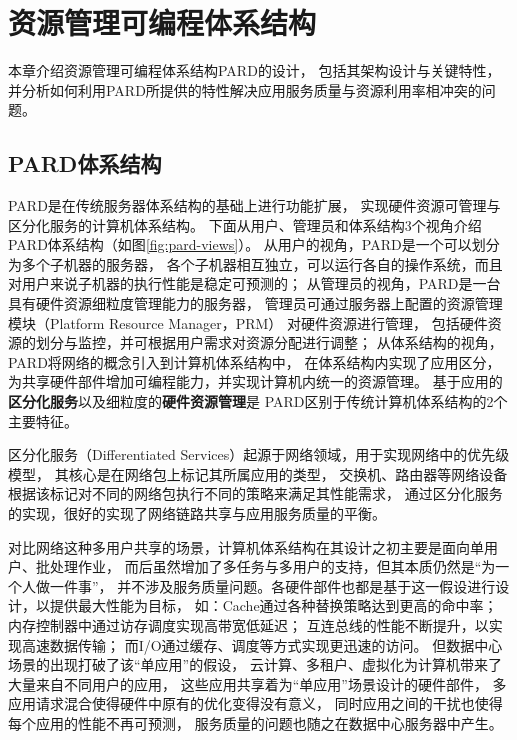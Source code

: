 

\chapter{资源管理可编程体系结构}
\label{chap:pardarch}

本章介绍资源管理可编程体系结构PARD\cite{pard:2015}的设计，
包括其架构设计与关键特性，
并分析如何利用PARD所提供的特性解决应用服务质量与资源利用率相冲突的问题。


\section{PARD体系结构}

PARD是在传统服务器体系结构的基础上进行功能扩展，
实现硬件资源可管理与区分化服务的计算机体系结构。
下面从用户、管理员和体系结构3个视角介绍PARD体系结构（如图\ref{fig:pard-views}）。
从用户的视角，PARD是一个可以划分为多个子机器的服务器，
各个子机器相互独立，可以运行各自的操作系统，而且对用户来说子机器的执行性能是稳定可预测的；
从管理员的视角，PARD是一台具有硬件资源细粒度管理能力的服务器，
管理员可通过服务器上配置的资源管理模块（Platform Resource Manager，PRM）
对硬件资源进行管理，
包括硬件资源的划分与监控，并可根据用户需求对资源分配进行调整；
从体系结构的视角，PARD将网络的概念引入到计算机体系结构中，
在体系结构内实现了应用区分，为共享硬件部件增加可编程能力，并实现计算机内统一的资源管理。
基于应用的\textbf{区分化服务}以及细粒度的\textbf{硬件资源管理}是
PARD区别于传统计算机体系结构的2个主要特征。

区分化服务（Differentiated Services）起源于网络领域，用于实现网络中的优先级模型，
其核心是在网络包上标记其所属应用的类型，
交换机、路由器等网络设备根据该标记对不同的网络包执行不同的策略来满足其性能需求，
通过区分化服务的实现，很好的实现了网络链路共享与应用服务质量的平衡。

对比网络这种多用户共享的场景，计算机体系结构在其设计之初主要是面向单用户、批处理作业，
而后虽然增加了多任务与多用户的支持，但其本质仍然是``为一个人做一件事''，
并不涉及服务质量问题。各硬件部件也都是基于这一假设进行设计，以提供最大性能为目标，
如：Cache通过各种替换策略达到更高的命中率；
内存控制器中通过访存调度实现高带宽低延迟；
互连总线的性能不断提升，以实现高速数据传输；
而I/O通过缓存、调度等方式实现更迅速的访问。
但数据中心场景的出现打破了该``单应用''的假设，
云计算、多租户、虚拟化为计算机带来了大量来自不同用户的应用，
这些应用共享着为``单应用''场景设计的硬件部件，
多应用请求混合使得硬件中原有的优化变得没有意义，
同时应用之间的干扰也使得每个应用的性能不再可预测，
服务质量的问题也随之在数据中心服务器中产生。

